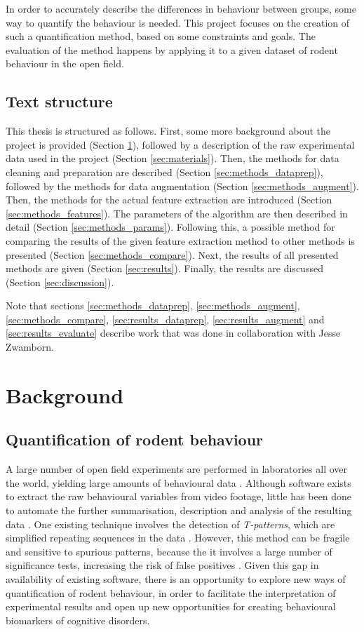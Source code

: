 \documentclass[conference,a4paper,twoside]{IEEEtran}
\begin{document}
In order to accurately describe the differences in behaviour between groups, some way to quantify the behaviour is needed. This project focuses on the creation of such a quantification method, based on some constraints and goals. The evaluation of the method happens by applying it to a given dataset of rodent behaviour in the open field.

\subsection{Text structure}
This thesis is structured as follows. First, some more background about the project is provided (Section \ref{sec:background}), followed by a description of the raw experimental data used in the project (Section \ref{sec:materials}). Then, the methods for data cleaning and preparation are described (Section \ref{sec:methods_dataprep}), followed by the methods for data augmentation (Section \ref{sec:methods_augment}). Then, the methods for the actual feature extraction are introduced (Section \ref{sec:methods_features}). The parameters of the algorithm are then described in detail (Section \ref{sec:methods_params}). Following this, a possible method for comparing the results of the given feature extraction method to other methods is presented (Section \ref{sec:methods_compare}). Next, the results of all presented methods are given (Section \ref{sec:results}). Finally, the results are discussed (Section \ref{sec:discussion}).

Note that sections \ref{sec:methods_dataprep}, \ref{sec:methods_augment}, \ref{sec:methods_compare}, \ref{sec:results_dataprep}, \ref{sec:results_augment} and \ref{sec:results_evaluate} describe work that was done in collaboration with Jesse Zwamborn.

\section{Background}
\label{sec:background}

\subsection{Quantification of rodent behaviour}
\label{sec:bg_quant}

A large number of open field experiments are performed in laboratories all over the world, yielding large amounts of behavioural data \cite{proposal}. Although software exists to extract the raw behavioural variables from video footage, little has been done to automate the further summarisation, description and analysis of the resulting data \cite{proposal}. One existing technique involves the detection of \emph{T-patterns}, which are simplified repeating sequences in the data \cite{casarrubea2015t}. However, this method can be fragile and sensitive to spurious patterns, because the it involves a large number of significance tests, increasing the risk of false positives \cite{salah2010t}. Given this gap in availability of existing software, there is an opportunity to explore new ways of quantification of rodent behaviour, in order to facilitate the interpretation of experimental results and open up new opportunities for creating behavioural biomarkers of cognitive disorders.
\end{document}
